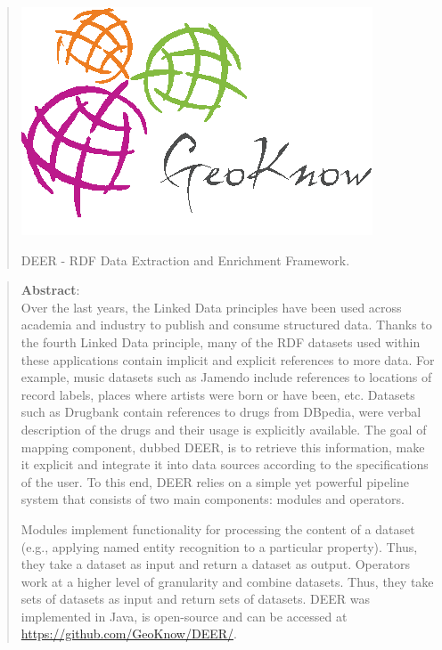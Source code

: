 \documentclass[a4paper,twoside,bibtotoc,abstracton,12pt,BCOR=15mm]{article}
\newcommand{\geolift}{\textsc{DEER}\xspace}
\begin{document}


\vspace*{\fill} 
\begin{quote} 
\centering 
\begin{center}
 \includegraphics[scale=0.5]{images/geoknow.png}
\end{center}
\begin{flushleft}
 \Large{\geolift}
 \small{ - RDF Data Extraction and Enrichment Framework.}
\end{flushleft}
\end{quote}
\vspace*{\fill}
\newpage

\vspace*{\fill} 
\begin{quote} 

\textbf{Abstract}: \\
Over the last years, the Linked Data principles have been used across academia and industry to publish and consume structured data. Thanks to the fourth Linked Data principle, many of the RDF datasets used within these applications contain implicit and explicit references to more data. For example, music datasets such as Jamendo include references to locations of record labels, places where artists were born or have been, etc. Datasets such as Drugbank contain references to drugs from DBpedia, were verbal description of the drugs and their usage is explicitly available. The goal of mapping component, dubbed DEER, is to retrieve this information, make it explicit and integrate it into data sources according to the specifications of the user. To this end, DEER relies on a simple yet powerful pipeline system that consists of two main components: modules and operators.

Modules implement functionality for processing the content of a dataset (e.g., applying named entity recognition to a particular property). Thus, they take a dataset as input and return a dataset as output. Operators work at a higher level of granularity and combine datasets. Thus, they take sets of datasets as input and return sets of datasets.
\geolift was implemented in Java, is open-source and can be accessed at \url{https://github.com/GeoKnow/DEER/}. 
\end{quote}
\vspace*{\fill}
\end{document}
